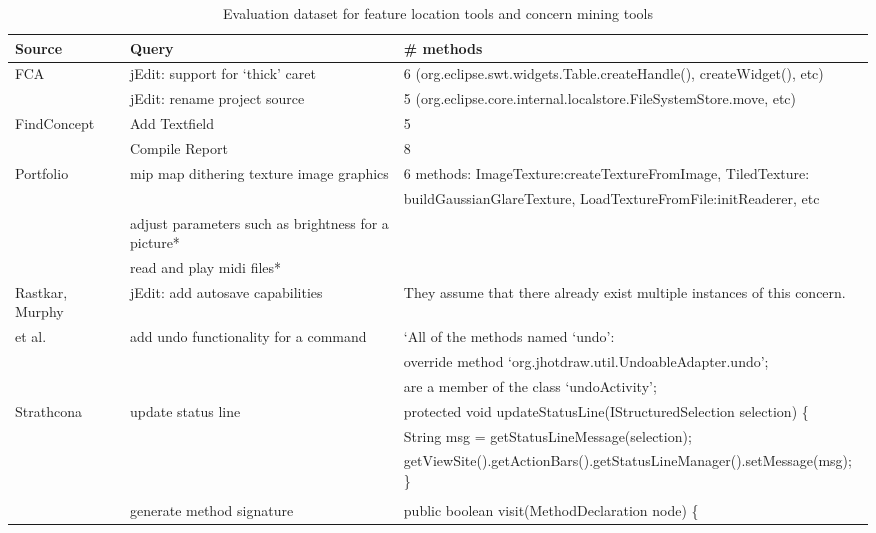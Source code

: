 

\begin{table*}[ht]
\begin{center}
\caption{Evaluation dataset for feature location tools and concern mining tools}
\label{tab:total}
\scriptsize{
\begin{tabular*}{1\textwidth}{@{}l|l|l@{}} \hline
Source&Query&\# methods\\\hline
FCA~\cite{Denys:FCA12}&jEdit: support for `thick' caret &6 (org.eclipse.swt.widgets.Table.createHandle(), createWidget(), etc)\\
&jEdit: rename project source&5 (org.eclipse.core.internal.localstore.FileSystemStore.move, etc)\\ \hline
FindConcept~\cite{Hill:FindConcept07}&Add Textfield&5\\
&Compile Report&8\\ \hline
Portfolio~\cite{Portfolio:DenysICSE11}&mip map dithering texture image graphics&6 methods: ImageTexture:createTextureFromImage, TiledTexture:\\ 
&&buildGaussianGlareTexture, LoadTextureFromFile:initReaderer, etc  \\
&adjust parameters such as brightness for a picture*\\
&read and play midi files*\\ \hline
Rastkar, Murphy&jEdit: add autosave capabilities&They assume that there already exist multiple instances of this concern.\\
 et al.~\cite{Murphy:nlConcern11}&add undo functionality for a command&`All of the methods named `undo': \\ 
 &&override method `org.jhotdraw.util.UndoableAdapter.undo';\\
 &&are a member of the class `undoActivity';\\ \hline
 Strathcona~\cite{Holmes:structural05}&update status line&protected void updateStatusLine(IStructuredSelection selection) \{\\
&&String msg = getStatusLineMessage(selection);\\
&&getViewSite().getActionBars().getStatusLineManager().setMessage(msg); \}\\ 
&&\\
&generate method signature&public boolean visit(MethodDeclaration node) \{\\

\end{tabular*}}
\end{center}
\end{table*}
